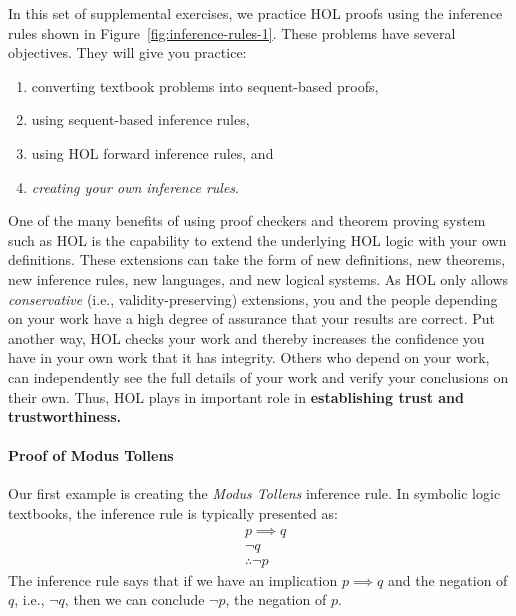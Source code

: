 In this set of supplemental exercises, we practice HOL proofs using
the inference rules shown in Figure~\ref{fig:inference-rules-1}.
These problems have several objectives. They will give you practice:
\begin{enumerate}
\item converting textbook problems into sequent-based proofs,
\item using sequent-based inference rules,
\item using HOL forward inference rules, and
\item \emph{creating your own inference rules}.
\end{enumerate}

One of the many benefits of using proof checkers and theorem proving
system such as HOL is the capability to extend the underlying HOL
logic with your own definitions.  These extensions can take the form
of new definitions, new theorems, new inference rules, new languages,
and new logical systems. As HOL only allows \emph{conservative} (i.e.,
validity-preserving) extensions, you and the people depending on your
work have a high degree of assurance that your results are
correct. Put another way, HOL checks your work and thereby increases
the confidence you have in your own work that it has integrity. Others
who depend on your work, can independently see the full details of
your work and verify your conclusions on their own.  Thus, HOL plays
in important role in \textbf{establishing trust and trustworthiness.}


\paragraph*{Proof of Modus Tollens}
\label{sec:modus-tollens}

Our first example is creating the \emph{Modus Tollens} inference
rule. In symbolic logic textbooks, the inference rule is typically
presented as:
\begin{align*}
  & p \implies q\\
  & \neg q\\
  & \therefore \neg p
\end{align*}
The inference rule says that if we have an implication $p \implies q$
and the negation of $q$, i.e., $\neg q$, then we can conclude $\neg
p$, the negation of $p$.

